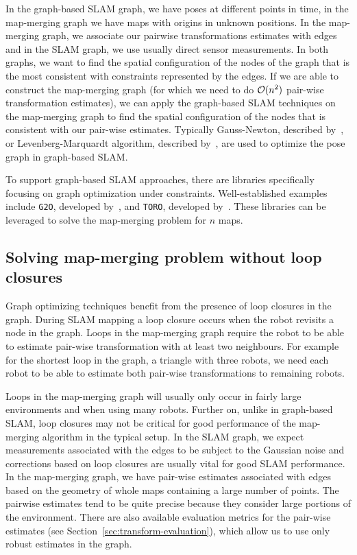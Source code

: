 In the graph-based \gls{SLAM} graph, we have poses at different points in time, in the map-merging graph we have maps with origins in unknown positions. In the map-merging graph, we associate our pairwise transformations estimates with edges and in the \gls{SLAM} graph, we use usually direct sensor measurements. In both graphs, we want to find the spatial configuration of the nodes of the graph that is the most consistent with constraints represented by the edges. If we are able to construct the map-merging graph (for which we need to do $\operatorname{\mathcal{O}}(n^2)$ pair-wise transformation estimates), we can apply the graph-based \gls{SLAM} techniques on the map-merging graph to find the spatial configuration of the nodes that is consistent with our pair-wise estimates. Typically Gauss-Newton, described by~\citet[ch.~3]{fletcher2013practical}, or Levenberg-Marquardt algorithm, described by~\citet{more1978levmarq}, are used to optimize the pose graph in graph-based \gls{SLAM}.

To support graph-based \gls{SLAM} approaches, there are libraries specifically focusing on graph optimization under constraints. Well-established examples include \texttt{G2O}, developed by~\citet{kummerle2011g2o}, and \texttt{TORO}, developed by~\citet{grisetti2007toro}. These libraries can be leveraged to solve the map-merging problem for $n$ maps.

\subsection{Solving map-merging problem without loop closures}

Graph optimizing techniques benefit from the presence of loop closures in the graph. During \gls{SLAM} mapping a loop closure occurs when the robot revisits a node in the graph. Loops in the map-merging graph require the robot to be able to estimate pair-wise transformation with at least two neighbours. For example for the shortest loop in the graph, a triangle with three robots, we need each robot to be able to estimate both pair-wise transformations to remaining robots.

Loops in the map-merging graph will usually only occur in fairly large environments and when using many robots. Further on, unlike in graph-based \gls{SLAM}, loop closures may not be critical for good performance of the map-merging algorithm in the typical setup. In the \gls{SLAM} graph, we expect measurements associated with the edges to be subject to the Gaussian noise and corrections based on loop closures are usually vital for good \gls{SLAM} performance. In the map-merging graph, we have pair-wise estimates associated with edges based on the geometry of whole maps containing a large number of points. The pairwise estimates tend to be quite precise because they consider large portions of the environment. There are also available evaluation metrics for the pair-wise estimates (see Section~\ref{sec:transform-evaluation}), which allow us to use only robust estimates in the graph.

